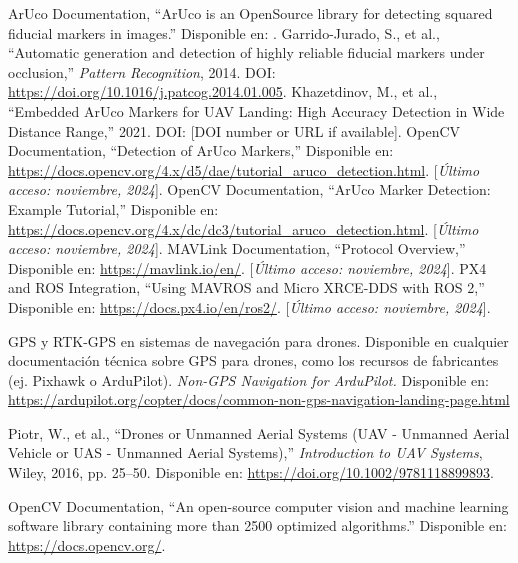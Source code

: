\begin{thebibliography}{30}
     ArUco Documentation, ``ArUco is an OpenSource library for detecting squared fiducial markers in images.'' Disponible en: \url{}. 
    Garrido-Jurado, S., et al., ``Automatic generation and detection of highly reliable fiducial markers under occlusion,'' \textit{Pattern Recognition}, 2014. DOI: \url{https://doi.org/10.1016/j.patcog.2014.01.005}.
     Khazetdinov, M., et al., ``Embedded ArUco Markers for UAV Landing: High Accuracy Detection in Wide Distance Range,'' 2021. DOI: [DOI number or URL if available].
    OpenCV Documentation, ``Detection of ArUco Markers,'' Disponible en: \url{https://docs.opencv.org/4.x/d5/dae/tutorial_aruco_detection.html}. [\textit{Último acceso: noviembre, 2024}].
    OpenCV Documentation, ``ArUco Marker Detection: Example Tutorial,'' Disponible en: \url{https://docs.opencv.org/4.x/dc/dc3/tutorial_aruco_detection.html}. [\textit{Último acceso: noviembre, 2024}].
    MAVLink Documentation, ``Protocol Overview,'' Disponible en: \url{https://mavlink.io/en/}. [\textit{Último acceso: noviembre, 2024}].
    PX4 and ROS Integration, ``Using MAVROS and Micro XRCE-DDS with ROS 2,'' Disponible en: \url{https://docs.px4.io/en/ros2/}. [\textit{Último acceso: noviembre, 2024}].

    GPS y RTK-GPS en sistemas de navegación para drones. Disponible en cualquier documentación técnica sobre GPS para drones, como los recursos de fabricantes (ej. Pixhawk o ArduPilot).
        \textit{Non-GPS Navigation for ArduPilot.} Disponible en: \url{https://ardupilot.org/copter/docs/common-non-gps-navigation-landing-page.html}









    
    Piotr, W., et al., ``Drones or Unmanned Aerial Systems (UAV - Unmanned Aerial Vehicle or UAS - Unmanned Aerial Systems),'' \textit{Introduction to UAV Systems}, Wiley, 2016, pp. 25--50. Disponible en: \url{https://doi.org/10.1002/9781118899893}.

    
   
     OpenCV Documentation, ``An open-source computer vision and machine learning software library containing more than 2500 optimized algorithms.'' Disponible en: \url{https://docs.opencv.org/}. 


\end{thebibliography}

